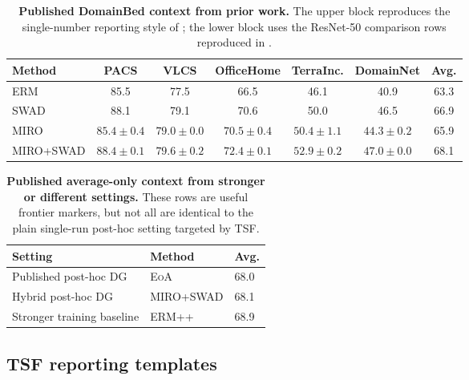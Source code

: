 \documentclass{article}
\newcommand{\tsf}{\textup{\textsc{TSF}}}
\newcommand{\swad}{\textup{\textsc{SWAD}}}
\newcommand{\eoa}{\textup{\textsc{EoA}}}
\newcommand{\miro}{\textup{\textsc{MIRO}}}
\newcommand{\erm}{\textup{\textsc{ERM}}}
\newcommand{\ermpp}{\textup{\textsc{ERM++}}}
\begin{document}
\begin{table}[t]
    \centering
    \small
    \caption{\textbf{Published DomainBed context from prior work.} The upper block reproduces the single-number reporting style of \citet{cha2021swad}; the lower block uses the ResNet-50 comparison rows reproduced in \citet{teterwak2025ermpp}.}
    \label{tab:published_context}
    \setlength{\tabcolsep}{5pt}
    \begin{tabular}{lcccccc}
        \toprule
        Method & PACS & VLCS & OfficeHome & TerraInc. & DomainNet & Avg. \\
        \midrule
        \erm{} \citep{cha2021swad} & 85.5 & 77.5 & 66.5 & 46.1 & 40.9 & 63.3 \\
        \swad{} \citep{cha2021swad} & 88.1 & 79.1 & 70.6 & 50.0 & 46.5 & 66.9 \\
        \midrule
        \miro{} \citep{teterwak2025ermpp} & \(85.4\pm0.4\) & \(79.0\pm0.0\) & \(70.5\pm0.4\) & \(50.4\pm1.1\) & \(44.3\pm0.2\) & 65.9 \\
        \miro{}+\swad{} \citep{teterwak2025ermpp} & \(88.4\pm0.1\) & \(79.6\pm0.2\) & \(72.4\pm0.1\) & \(52.9\pm0.2\) & \(47.0\pm0.0\) & 68.1 \\
        \bottomrule
    \end{tabular}
\end{table}

\begin{table}[t]
    \centering
    \small
    \caption{\textbf{Published average-only context from stronger or different settings.} These rows are useful frontier markers, but not all are identical to the plain single-run post-hoc setting targeted by \tsf{}.}
    \label{tab:published_context_avg}
    \begin{tabular}{lll}
        \toprule
        Setting & Method & Avg. \\
        \midrule
        Published post-hoc DG & \eoa{} \citep{arpit2022eoa} & 68.0 \\
        Hybrid post-hoc DG & \miro{}+\swad{} \citep{teterwak2025ermpp} & 68.1 \\
        Stronger training baseline & \ermpp{} \citep{teterwak2025ermpp} & 68.9 \\
        \bottomrule
    \end{tabular}
\end{table}

\subsection{\tsf{} reporting templates}
\end{document}
